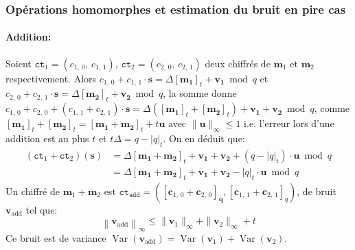 \documentclass[11pt, headsepline, a4paper, fleqn, oneside]{article}
\begin{document}
\subsubsection{Opérations homomorphes et estimation du bruit en pire cas}
\paragraph{Addition:} Soient $\texttt{ct}_{1} = (c_{1,\,0},\,c_{1,\,1}),\, \texttt{ct}_{2} = (c_{2,\,0},\,c_{2,\,1})$ deux chiffrés de $\boldsymbol{m}_{1}$ et $\boldsymbol{m}_{2}$ respectivement. Alors $c_{1,\,0} + c_{1,\,1}\cdot \boldsymbol{s}= \Delta[\boldsymbol{m_1}]_{t}+\boldsymbol{v_1} \bmod q$ et $c_{2,\,0} + c_{2,\,1}\cdot \boldsymbol{s}= \Delta[\boldsymbol{m_2}]_{t}+\boldsymbol{v_2} \bmod q$, la somme donne $c_{1,\,0}+c_{2,\,0} + (c_{1,\,1}+c_{2,\,1})\cdot \boldsymbol{s}= \Delta([\boldsymbol{m_1}]_{t}+[\boldsymbol{m_2}]_{t})+\boldsymbol{v_1}+ \boldsymbol{v_2}\bmod q$, comme $[\boldsymbol{m_1}]_{t}+[\boldsymbol{m_2}]_{t} = [\boldsymbol{m_1 +m_2}]_{t} + t\boldsymbol{u}$ avec $\|\boldsymbol{u}\|_{\infty}\leq 1$ i.e. l'erreur lors d'une addition est au plus $t$ et $t \Delta=q-|q|_{t}$. On en déduit que:
$$\begin{aligned}
    (\texttt{ct}_{1}+\texttt{ct}_{2})(\boldsymbol{s}) &= \Delta[\boldsymbol{m_1 +m_2}]_{t} + \boldsymbol{v_1}+ \boldsymbol{v_2} + (q-|q|_{t}) \cdot \boldsymbol{u} \bmod q \\&= \Delta[\boldsymbol{m_1 +m_2}]_{t} + \boldsymbol{v_1}+ \boldsymbol{v_2} -|q|_{t} \cdot \boldsymbol{u} \bmod q
\end{aligned}$$
Un chiffré de $\boldsymbol{m}_{1}+\boldsymbol{m}_{2}$ est  $\texttt{ct}_{\texttt{add}}=\left(\left[\boldsymbol{c}_{1,\,0}+\boldsymbol{c}_{2,\,0}\right]_{\boldsymbol{q}},\left[\boldsymbol{c}_{1,\,1}+\boldsymbol{c}_{2,\,1}\right]_{q}\right)$, de bruit $\boldsymbol{v}_{\mathrm{add}}$ tel que:
\begin{equation}
    \left\|\boldsymbol{v}_{\mathrm{add}}\right\|_{\infty} \leq\|\boldsymbol{v}_{1}\|_{\infty}+\|\boldsymbol{v}_{2}\|_{\infty}+t
\end{equation}
Ce bruit est de variance $\operatorname{Var}(\boldsymbol{v}_{\mathrm{add}}) = \operatorname{Var}(\boldsymbol{v}_1) + \operatorname{Var}(\boldsymbol{v}_2)$.
\end{document}
